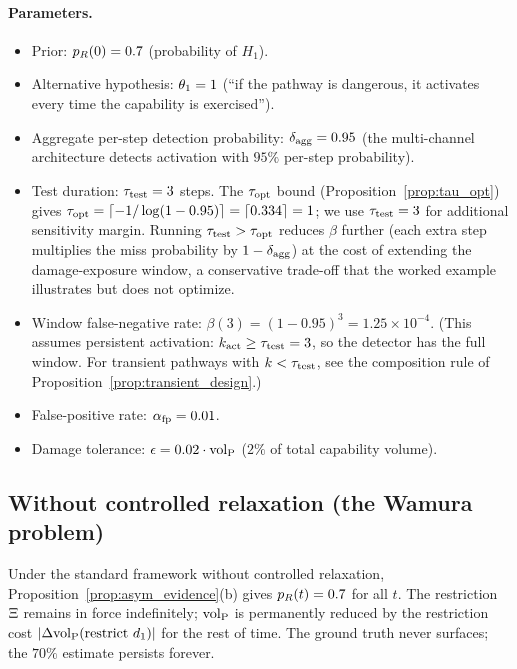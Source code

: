 \paragraph{Parameters.}
\begin{itemize}
\item Prior: $p_R(0) = 0.7$ (probability of $H_1$).
\item Alternative hypothesis: $\theta_1 = 1$ (``if the pathway
  is dangerous, it activates every time the capability is
  exercised'').
\item Aggregate per-step detection probability: $\delta_{\mathrm{agg}} = 0.95$
  (the multi-channel architecture detects activation with $95\%$
  per-step probability).
\item Test duration: $\tau_{\mathrm{test}} = 3$ steps.  The
  $\tau_{\mathrm{opt}}$ bound (Proposition~\ref{prop:tau_opt}) gives
  $\tau_{\mathrm{opt}} = \lceil -1/\log(1 - 0.95) \rceil = \lceil 0.334
  \rceil = 1$; we use $\tau_{\mathrm{test}} = 3$ for additional sensitivity
  margin.  Running $\tau_{\mathrm{test}} > \tau_{\mathrm{opt}}$ reduces $\beta$
  further (each extra step multiplies the miss probability by
  $1 - \delta_{\mathrm{agg}}$) at the cost of extending the damage-exposure
  window, a conservative trade-off that the worked example
  illustrates but does not optimize.
\item Window false-negative rate:
  $\beta(3) = (1 - 0.95)^3 = 1.25 \times 10^{-4}$.
  (This assumes persistent activation: $k_{\mathrm{act}} \geq
  \tau_{\mathrm{test}} = 3$, so the detector has the full window.  For
  transient pathways with $k < \tau_{\mathrm{test}}$, see the composition
  rule of Proposition~\ref{prop:transient_design}.)
\item False-positive rate: $\alpha_{\mathrm{fp}} = 0.01$.
\item Damage tolerance: $\epsilon = 0.02 \cdot {\operatorname{vol}_{\mathrm{P}}}$ ($2\%$
  of total capability volume).
\end{itemize}

\subsection{Without controlled relaxation (the Wamura problem)}

Under the standard framework without controlled relaxation,
Proposition~\ref{prop:asym_evidence}(b) gives $p_R(t) = 0.7$ for
all $t$.  The restriction $\Xi$ remains in force
indefinitely; ${\operatorname{vol}_{\mathrm{P}}}$ is permanently reduced by the restriction
cost $|\Delta {\operatorname{vol}_{\mathrm{P}}}(\text{restrict } d_1)|$ for the rest of time.
The ground truth never surfaces; the $70\%$ estimate persists
forever.

